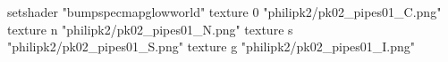 setshader "bumpspecmapglowworld"
    texture 0 "philipk2/pk02_pipes01_C.png"
    texture n "philipk2/pk02_pipes01_N.png"
    texture s "philipk2/pk02_pipes01_S.png"
    texture g "philipk2/pk02_pipes01_I.png"